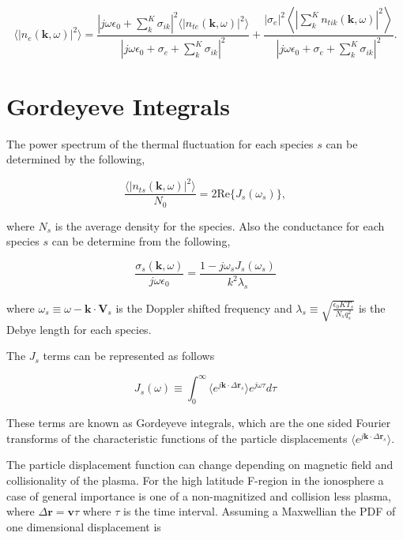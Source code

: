 \documentclass[10pt]{report}
\begin{document}
\begin{equation}
\label{eq:sumspeceq}
\displaystyle \langle \left|n_e(\mathbf{k},\omega)\right|^2\rangle = \frac{\left|j\omega\epsilon_0 +  \sum_k^K\sigma_{ik} \right|^2 \langle |n_{te}(\mathbf{k},\omega)|^2\rangle}{\left|j\omega\epsilon_0 +\sigma_e+ \sum_k^K\sigma_{ik} \right|^2} + \frac{| \sigma_e|^2 \left \langle \left|\sum_k^Kn_{tik}(\mathbf{k},\omega)\right|^2\right\rangle}{\left|j\omega\epsilon_0 +\sigma_e+ \sum_k^K\sigma_{ik} \right|^2}.
\end{equation}

\section*{Gordeyeve Integrals}
The power spectrum of the thermal fluctuation for each species $s$ can be determined by the following,

\begin{equation}
\label{eq:thermalfl}
\frac{\langle|n_{ts}(\mathbf{k},\omega)|^2\rangle}{N_0} = 2\text{Re}\{J_s(\omega_s)\},
\end{equation}

\noindent where $N_s$ is the average density for the species.  Also the conductance for each species $s$ can be determine from the following,

\begin{equation}
\label{eq:cond}
\frac{\sigma_{s}(\mathbf{k},\omega)}{j\omega\epsilon_0} = \frac{1-j\omega_s J_s(\omega_s)}{k^2\lambda_s}
\end{equation}

\noindent where $\omega_s \equiv \omega-\mathbf{k}\cdot\mathbf{V}_s $ is the Doppler shifted frequency and $\lambda_s \equiv \sqrt{\frac{\epsilon_0 KT_s}{N_s q_s^2}}$ is the Debye length for each species.

The $J_s$ terms can be represented as follows

\begin{equation}
\label{eq:gord}
J_s(\omega)\equiv \int_0^\infty \langle e^{j\mathbf{k}\cdot\Delta \mathbf{r}_s}\rangle e^{j\omega\tau}d\tau
\end{equation}

\noindent These terms are known as Gordeyeve integrals, which are the one sided Fourier transforms of the characteristic functions of the particle displacements $\langle e^{j\mathbf{k}\cdot\Delta\mathbf{r}_s}\rangle$.  

The particle displacement function can change depending on magnetic field and collisionality of the plasma. For the high latitude F-region in the ionosphere a case of general importance is one of a non-magnitized and collision less plasma, where $\Delta\mathbf{r} = \mathbf{v}\tau$ where $\tau$ is the time interval. Assuming a Maxwellian the PDF of one dimensional displacement is
\end{document}

